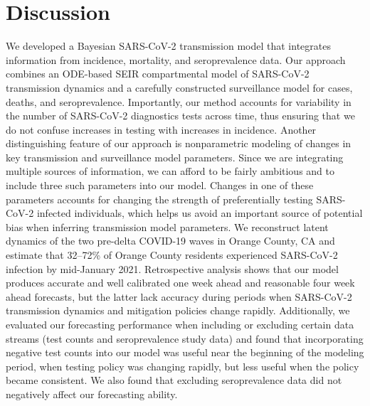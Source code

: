 \section{Discussion}
\label{ch_4:sec:discussion}
We developed a Bayesian SARS-CoV-2 transmission model that integrates information from incidence, mortality, and seroprevalence data.
Our approach combines an ODE-based SEIR compartmental model of SARS-CoV-2 transmission dynamics and a carefully constructed surveillance model for cases,  deaths, and seroprevalence.
Importantly, our method accounts for variability in the number of SARS-CoV-2 diagnostics tests across time, thus ensuring that we do not confuse increases in testing with increases in incidence.
Another distinguishing feature of our approach is nonparametric modeling of changes in key transmission and surveillance model parameters.
Since we are integrating multiple sources of information, we can afford to be fairly ambitious and to include three such parameters into our model.
Changes in one of these parameters accounts for changing the strength of preferentially testing SARS-CoV-2 infected individuals, which helps us avoid an important source of potential bias when inferring transmission model parameters.
We reconstruct latent dynamics of the two pre-delta COVID-19 waves in Orange County, CA and estimate that 32--72\% of Orange County residents experienced SARS-CoV-2 infection by mid-January 2021.
Retrospective analysis shows that our model produces accurate and well calibrated one week ahead and reasonable four week ahead forecasts, but the latter lack accuracy during periods when SARS-CoV-2 transmission dynamics and mitigation policies change rapidly.
Additionally, we evaluated our forecasting performance when including or excluding certain data streams (test counts and seroprevalence study data) and found that incorporating negative test counts into our model was useful near the beginning of the modeling period, when testing policy was changing rapidly, but less useful when the policy became consistent.
We also found that excluding seroprevalence data did not negatively affect our forecasting ability.

